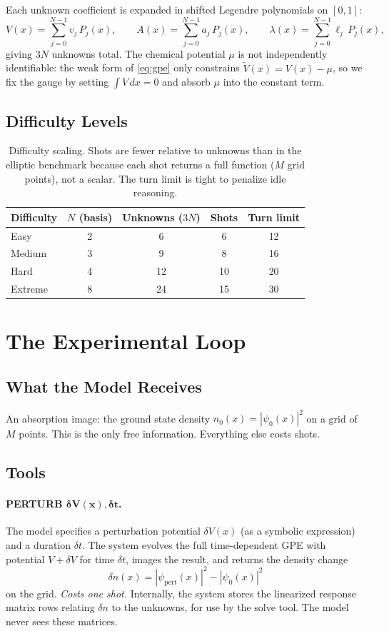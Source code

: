 \documentclass[11pt]{article}
\begin{document}
Each unknown coefficient is expanded in shifted Legendre polynomials on $[0,1]$:
\[
V(x) = \sum_{j=0}^{N-1} v_j\,P_j(x), \qquad
A(x) = \sum_{j=0}^{N-1} a_j\,P_j(x), \qquad
\lambda(x) = \sum_{j=0}^{N-1} \ell_j\,P_j(x),
\]
giving $3N$ unknowns total. The chemical potential $\mu$ is not independently identifiable: the weak form of \eqref{eq:gpe} only constrains $\tilde{V}(x) = V(x) - \mu$, so we fix the gauge by setting $\int V\,dx = 0$ and absorb $\mu$ into the constant term.

\subsection{Difficulty Levels}

\begin{table}[h]
\centering
\begin{tabular}{lcccc}
\toprule
Difficulty & $N$ (basis) & Unknowns ($3N$) & Shots & Turn limit \\
\midrule
Easy     & 2 & 6  & 6  & 12 \\
Medium   & 3 & 9  & 8  & 16 \\
Hard     & 4 & 12 & 10 & 20 \\
Extreme  & 8 & 24 & 15 & 30 \\
\bottomrule
\end{tabular}
\caption{Difficulty scaling. Shots are fewer relative to unknowns than in the elliptic benchmark because each shot returns a full function ($M$ grid points), not a scalar. The turn limit is tight to penalize idle reasoning.}
\label{tab:difficulty}
\end{table}

\section{The Experimental Loop}

\subsection{What the Model Receives}

An absorption image: the ground state density $n_0(x) = |\psi_0(x)|^2$ on a grid of $M$ points. This is the only free information. Everything else costs shots.

\subsection{Tools}

\paragraph{PERTURB $\boldsymbol{\delta V(x), \delta t}$.}
The model specifies a perturbation potential $\delta V(x)$ (as a symbolic expression) and a duration $\delta t$. The system evolves the full time-dependent GPE with potential $V + \delta V$ for time $\delta t$, images the result, and returns the density change
\[
\delta n(x) = |\psi_{\mathrm{pert}}(x)|^2 - |\psi_0(x)|^2
\]
on the grid. \emph{Costs one shot.} Internally, the system stores the linearized response matrix rows relating $\delta n$ to the unknowns, for use by the solve tool. The model never sees these matrices.
\end{document}
